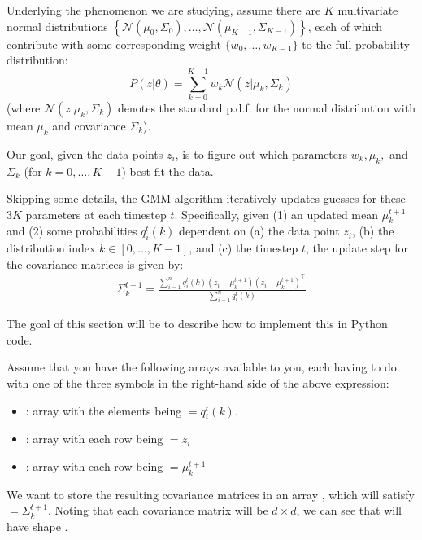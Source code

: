 Underlying the phenomenon we are studying, assume there are $K$ multivariate normal distributions $\left\{\mathcal{N}(\mu_0, \Sigma_0), \ldots, \mathcal{N}(\mu_{K-1}, \Sigma_{K-1})\right\}$, each of which contribute with some corresponding weight $\{w_0, \ldots, w_{K-1}\}$ to the full probability distribution:
$$P(z|\theta) = \sum_{k=0}^{K-1} w_k \mathcal{N}(z | \mu_k, \Sigma_k) $$
(where $\mathcal{N}(z | \mu_k, \Sigma_k) $ denotes the standard p.d.f. for the normal distribution with mean $\mu_k$  and covariance $ \Sigma_k $). 

Our goal, given the data points $z_i$, is to figure out which parameters $w_k, \mu_k,$ and $\Sigma_k$ (for $k = 0, \ldots, K-1$) best fit the data. 

Skipping some details, the GMM algorithm iteratively updates guesses for these $3K$ parameters at each timestep $t$.
Specifically, given (1) an updated mean $\mu_k^{t+1}$ and (2) some probabilities $q_i^t(k)$ dependent on (a) the data point $z_i$, (b) the distribution index $k \in [0, \ldots, K-1]$,  and (c) the timestep $t$, the update step for the covariance matrices is given by:
\begin{align*}
	\Sigma_k^{t+1} = \frac{\sum_{i=1}^{n} q_i^t(k) (z_i - \mu_k^{t+1}) (z_i - \mu_k^{t+1})^\top}{\sum_{i=1}^{n} q_i^t(k)}
\end{align*}

The goal of this section will be to describe how to implement this in Python code.

Assume that you have the following arrays available to you, each having to do with one of the three symbols in the right-hand side of the above expression:
\begin{itemize}
	\item {} :  array with the elements being  $ = q_i^t(k)$.
	
	\item {}:  array with each row being  $ = z_{i} $ 
		
	\item {}:  array with each row being  $= \mu_{k}^{t+1}$
\end{itemize}

We want to store the resulting covariance matrices in an array , which will satisfy  $= \Sigma_{k}^{t+1}$. Noting that each covariance matrix will be $d \times d$, we can see that  will have shape .

